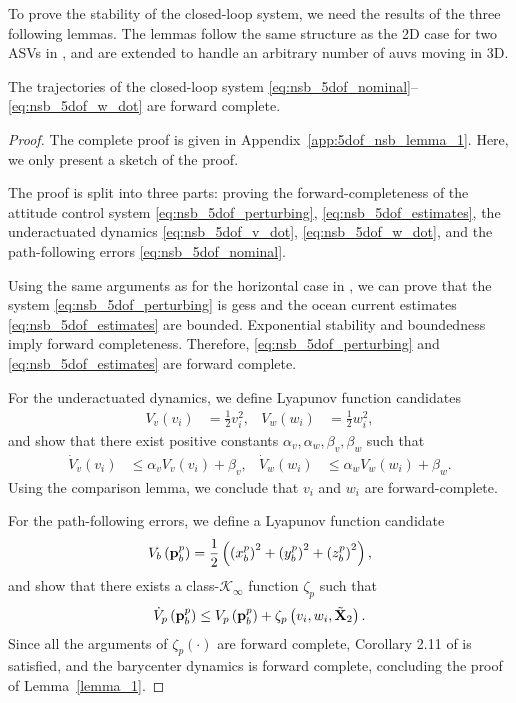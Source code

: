 To prove the stability of the closed-loop system, we need the results of the three following lemmas.
The lemmas follow the same structure as the 2D case for two ASVs in \cite{eek_formation_2021}, and are extended to handle an arbitrary number of \glspl{auv} moving in 3D.
\begin{lemma}
    \label{lemma_1}
    The trajectories of the closed-loop system \eqref{eq:nsb_5dof_nominal}--\eqref{eq:nsb_5dof_w_dot} are forward complete.
\end{lemma}

\begin{proof}
    The complete proof is given in Appendix~\ref{app:5dof_nsb_lemma_1}.
    Here, we only present a sketch of the proof.

    The proof is split into three parts: proving the forward-completeness of the attitude control system \eqref{eq:nsb_5dof_perturbing}, \eqref{eq:nsb_5dof_estimates}, the underactuated dynamics \eqref{eq:nsb_5dof_v_dot}, \eqref{eq:nsb_5dof_w_dot}, and the path-following errors \eqref{eq:nsb_5dof_nominal}.

    Using the same arguments as for the horizontal case in \cite{moe_LOS_2016}, we can prove that the system \eqref{eq:nsb_5dof_perturbing} is \glspl{ges} and the ocean current estimates \eqref{eq:nsb_5dof_estimates} are bounded.
    Exponential stability and boundedness imply forward completeness. Therefore, \eqref{eq:nsb_5dof_perturbing} and \eqref{eq:nsb_5dof_estimates} are forward complete.

    For the underactuated dynamics, we define Lyapunov function candidates
    \begin{align} 
        V_v(v_i) &= \frac{1}{2} v_i^2, &
        V_w(w_i) &= \frac{1}{2} w_i^2, \label{eq:nsb_5dof_underactuated_LFC}
    \end{align}
    and show that there exist positive constants $\alpha_v, \alpha_w, \beta_v, \beta_w$ such that
    \begin{align} 
        \dot{V}_v(v_i) & \leq \alpha_v V_v(v_i) + \beta_v, &
        \dot{V}_w(w_i) & \leq \alpha_w V_w(w_i) + \beta_w.
    \end{align}
    Using the comparison lemma, we conclude that $v_i$ and $w_i$ are forward-complete.

    For the path-following errors, we define a Lyapunov function candidate
    \begin{equation}
        V_b\left(\mathbf{p}_b^p\right) = \frac{1}{2} \left(\left(x_b^p\right)^2 + \left(y_b^p\right)^2 + \left(z_b^p\right)^2\right),
    \end{equation}
    and show that there exists a class-$\mathcal{K}_{\infty}$ function $\zeta_p$ such that
    \begin{equation}
        \dot{V}_p\left(\mathbf{p}_b^p\right) \leq V_p\left(\mathbf{p}_b^p\right) + \zeta_p\left(v_i, w_i, \tilde{\mathbf{X}}_2\right).
    \end{equation}
    Since all the arguments of $\zeta_p(\cdot)$ are forward complete, Corollary 2.11 of \cite{angeli_forward_1999} is satisfied, and the barycenter dynamics is forward complete, concluding the proof of Lemma~\ref{lemma_1}.
\end{proof}

